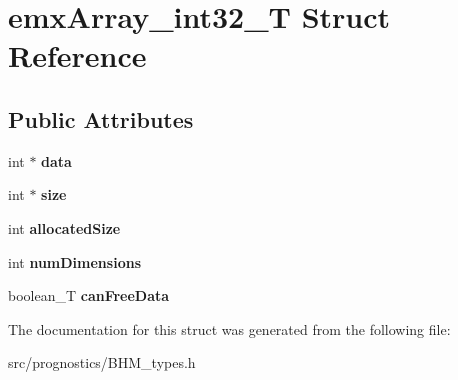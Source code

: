 \hypertarget{structemxArray__int32__T}{}\section{emx\+Array\+\_\+int32\+\_\+T Struct Reference}
\label{structemxArray__int32__T}
\subsection*{Public Attributes}
\begin{DoxyCompactItemize}
\item 
\mbox{\label{structemxArray__int32__T_a80b84fa320f402ac9c8a120e0b611a15}} 
int $\ast$ {\bfseries data}
\item 
\mbox{\label{structemxArray__int32__T_a8137e9615a8e7fa3ad6e5346eaeabd7a}} 
int $\ast$ {\bfseries size}
\item 
\mbox{\label{structemxArray__int32__T_a40267be7c59b715b622ac8c82b143ecc}} 
int {\bfseries allocated\+Size}
\item 
\mbox{\label{structemxArray__int32__T_a1fe12d975748afc198d297b4c4b0328d}} 
int {\bfseries num\+Dimensions}
\item 
\mbox{\label{structemxArray__int32__T_a9d7b6b3e023288e6a3ff8206752d8ce3}} 
boolean\+\_\+T {\bfseries can\+Free\+Data}
\end{DoxyCompactItemize}


The documentation for this struct was generated from the following file\+:\begin{DoxyCompactItemize}
\item 
src/prognostics/B\+H\+M\+\_\+types.\+h\end{DoxyCompactItemize}

